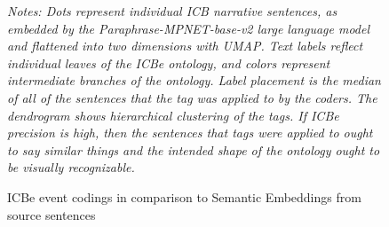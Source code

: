 \documentclass{article}
\begin{document}
\begin{figure}[H]
\caption{ICBe event codings in comparison to Semantic Embeddings from source sentences\label{fig:semantic_embeddings}}
\textit{Notes: Dots represent individual ICB narrative sentences, as embedded by the Paraphrase-MPNET-base-v2 large language model and flattened into two dimensions with UMAP. Text labels reflect individual leaves of the ICBe ontology, and colors represent intermediate branches of the ontology. Label placement is the median of all of the sentences that the tag was applied to by the coders. The dendrogram shows hierarchical clustering of the tags. If ICBe precision is high, then the sentences that tags were applied to ought to say similar things and the intended shape of the ontology ought to be visually recognizable. }
\end{figure}
\clearpage

\clearpage
\end{document}
